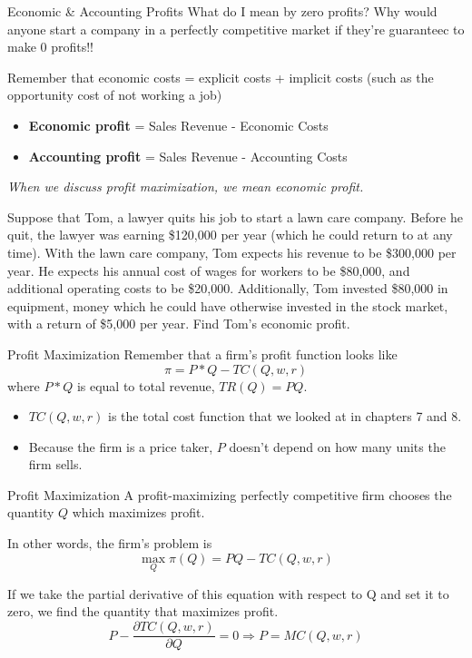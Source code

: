 \documentclass[11pt,t]{beamer}
\begin{document}
\begin{frame}{Economic \& Accounting Profits}
  What do I mean by zero profits? Why would anyone start a company in a perfectly competitive market if they're guaranteec to make 0 profits!!

  \bigskip\pause
  Remember that economic costs = explicit costs + implicit costs (such as the opportunity cost of not working a job)

  \begin{itemize}
    \item \textbf{Economic profit} = Sales Revenue - Economic Costs
    
    \item \textbf{Accounting profit} = Sales Revenue - Accounting Costs
  \end{itemize}


  \bigskip
  \emph{When we discuss profit maximization, we mean economic profit.}
\end{frame}

\begin{frame}{}
  Suppose that Tom, a lawyer quits his job to start a lawn care company. Before he quit, the lawyer was earning \$120,000 per year (which he could return to at any time). With the lawn care company, Tom expects his revenue to be \$300,000 per year. He expects his annual cost of wages for workers to be \$80,000, and additional operating costs to be \$20,000. Additionally, Tom invested \$80,000 in equipment, money which he could have otherwise invested in the stock market, with a return of \$5,000 per year. Find Tom's economic profit.
\end{frame}

\begin{frame}{Profit Maximization}
  Remember that a firm's profit function looks like
  $$
    \pi = P * Q - TC(Q,w,r)
  $$
  where $P * Q$ is equal to total revenue, $TR(Q) = PQ$.

  \begin{itemize}
    \item $TC(Q,w,r)$ is the total cost function that we looked at in chapters 7 and 8.
    
    \item Because the firm is a price taker, $P$ doesn't depend on how many units the firm sells.
  \end{itemize}
\end{frame}

\begin{frame}{Profit Maximization}
  A profit-maximizing perfectly competitive firm chooses the quantity $Q$ which maximizes profit.

  \bigskip
  In other words, the firm's problem is
  $$
    \max_Q \pi(Q) = PQ-TC(Q,w,r)
  $$

  \bigskip\pause
  If we take the partial derivative of this equation with respect to Q and set it to zero, we find the quantity that maximizes profit.
  $$
    P-\frac{\partial TC(Q,w,r)}{\partial Q} = 0  \Rightarrow P = MC(Q,w,r)
  $$
\end{frame}
\end{document}
